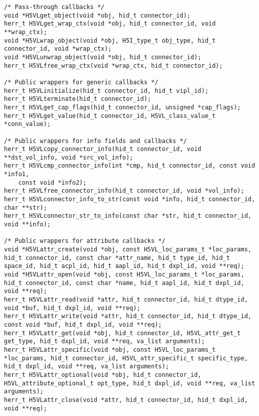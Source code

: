 \begin{appendices}
\begin{lstlisting}
/* Pass-through callbacks */                                                     
void *H5VLget_object(void *obj, hid_t connector_id);                      
herr_t H5VLget_wrap_ctx(void *obj, hid_t connector_id, void **wrap_ctx);  
void *H5VLwrap_object(void *obj, H5I_type_t obj_type, hid_t connector_id, void *wrap_ctx);                                                             
void *H5VLunwrap_object(void *obj, hid_t connector_id);                   
herr_t H5VLfree_wrap_ctx(void *wrap_ctx, hid_t connector_id);             
                                                                                 
/* Public wrappers for generic callbacks */                                      
herr_t H5VLinitialize(hid_t connector_id, hid_t vipl_id);                 
herr_t H5VLterminate(hid_t connector_id);                                 
herr_t H5VLget_cap_flags(hid_t connector_id, unsigned *cap_flags);        
herr_t H5VLget_value(hid_t connector_id, H5VL_class_value_t *conn_value); 
                                                                                 
/* Public wrappers for info fields and callbacks */                              
herr_t H5VLcopy_connector_info(hid_t connector_id, void **dst_vol_info, void *src_vol_info);
herr_t H5VLcmp_connector_info(int *cmp, hid_t connector_id, const void *info1,
    const void *info2);                                                          
herr_t H5VLfree_connector_info(hid_t connector_id, void *vol_info);       
herr_t H5VLconnector_info_to_str(const void *info, hid_t connector_id, char **str);
herr_t H5VLconnector_str_to_info(const char *str, hid_t connector_id, void **info);

/* Public wrappers for attribute callbacks */                                    
void *H5VLattr_create(void *obj, const H5VL_loc_params_t *loc_params, hid_t connector_id, const char *attr_name, hid_t type_id, hid_t space_id, hid_t acpl_id, hid_t aapl_id, hid_t dxpl_id, void **req);
void *H5VLattr_open(void *obj, const H5VL_loc_params_t *loc_params, hid_t connector_id, const char *name, hid_t aapl_id, hid_t dxpl_id, void **req);
herr_t H5VLattr_read(void *attr, hid_t connector_id, hid_t dtype_id, void *buf, hid_t dxpl_id, void **req);
herr_t H5VLattr_write(void *attr, hid_t connector_id, hid_t dtype_id, const void *buf, hid_t dxpl_id, void **req);
herr_t H5VLattr_get(void *obj, hid_t connector_id, H5VL_attr_get_t get_type, hid_t dxpl_id, void **req, va_list arguments);
herr_t H5VLattr_specific(void *obj, const H5VL_loc_params_t *loc_params, hid_t connector_id, H5VL_attr_specific_t specific_type, hid_t dxpl_id, void **req, va_list arguments);
herr_t H5VLattr_optional(void *obj, hid_t connector_id, H5VL_attribute_optional_t opt_type, hid_t dxpl_id, void **req, va_list arguments);
herr_t H5VLattr_close(void *attr, hid_t connector_id, hid_t dxpl_id, void **req);
                                                                                 

\end{lstlisting}
\end{appendices}
